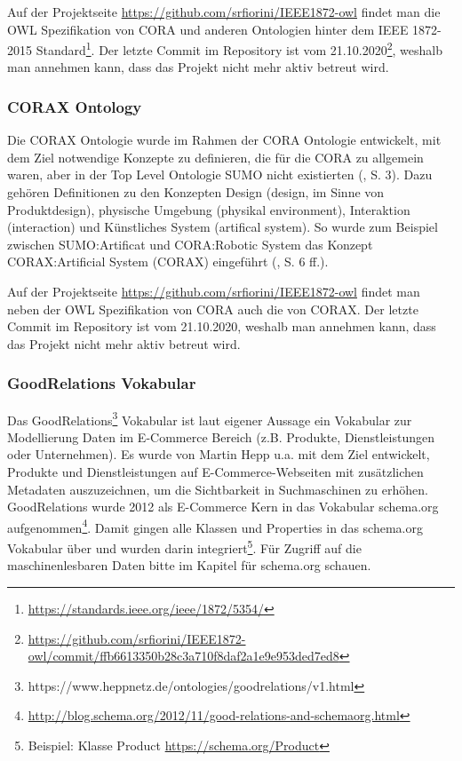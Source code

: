 \documentclass{article}
\begin{document}
Auf der Projektseite \url{https://github.com/srfiorini/IEEE1872-owl} findet man die OWL Spezifikation von CORA und anderen Ontologien hinter dem IEEE 1872-2015 Standard\footnote{\url{https://standards.ieee.org/ieee/1872/5354/}}. Der letzte Commit im Repository ist vom 21.10.2020\footnote{\url{https://github.com/srfiorini/IEEE1872-owl/commit/ffb6613350b28c3a710f8daf2a1e9e953ded7ed8}}, weshalb man annehmen kann, dass das Projekt nicht mehr aktiv betreut wird.

\subsubsection{CORAX Ontology}


Die CORAX Ontologie wurde im Rahmen der CORA Ontologie entwickelt, mit dem Ziel notwendige Konzepte zu definieren, die für die CORA zu allgemein waren, aber in der Top Level Ontologie SUMO nicht existierten (\cite{fiorini2015extensions}, S. 3).
Dazu gehören Definitionen zu den Konzepten Design (design, im Sinne von Produktdesign), physische Umgebung (physikal environment), Interaktion (interaction) und Künstliches System (artifical system).
So wurde zum Beispiel zwischen SUMO:Artificat und CORA:Robotic System das Konzept CORAX:Artificial System (CORAX) eingeführt (\cite{fiorini2015extensions}, S. 6 ff.).

Auf der Projektseite \url{https://github.com/srfiorini/IEEE1872-owl} findet man neben der OWL Spezifikation von CORA auch die von CORAX. Der letzte Commit im Repository ist vom 21.10.2020, weshalb man annehmen kann, dass das Projekt nicht mehr aktiv betreut wird.

\subsubsection{GoodRelations Vokabular}

Das GoodRelations\footnote{https://www.heppnetz.de/ontologies/goodrelations/v1.html} Vokabular ist laut eigener Aussage ein Vokabular zur Modellierung Daten im E-Commerce Bereich (z.B. Produkte, Dienstleistungen oder Unternehmen).
Es wurde von Martin Hepp u.a. mit dem Ziel entwickelt, Produkte und Dienstleistungen auf E-Commerce-Webseiten mit zusätzlichen Metadaten auszuzeichnen, um die Sichtbarkeit in Suchmaschinen zu erhöhen.
GoodRelations wurde 2012 als E-Commerce Kern in das Vokabular schema.org aufgenommen\footnote{\url{http://blog.schema.org/2012/11/good-relations-and-schemaorg.html}}.
Damit gingen alle Klassen und Properties in das schema.org Vokabular über und wurden darin integriert\footnote{Beispiel: Klasse Product \url{https://schema.org/Product}}.
Für Zugriff auf die maschinenlesbaren Daten bitte im Kapitel für schema.org schauen.
\end{document}
